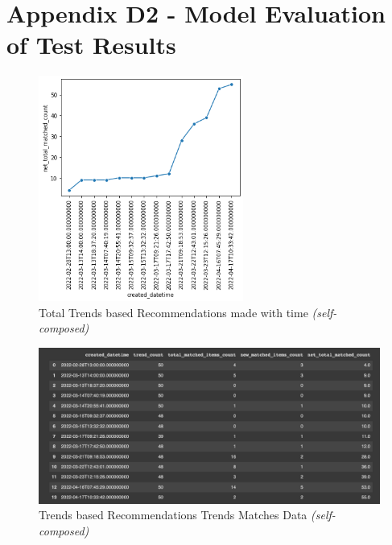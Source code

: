 \clearpage
\section*{Appendix D2 - Model Evaluation of Test Results}

\begin{figure}[h!]
\centering
\includegraphics[width=0.6\textwidth]{images/Testing/trends/trends-matches-eval2.png}
\caption{Total Trends based Recommendations made with time \textit{(self-composed)}}
\label{fig:trends-recsys-total-matches}
\end{figure}

\begin{figure}[h!]
\centering
\includegraphics[width=\textwidth]{images/Testing/trends/trend-match-count-data.png}
\caption{Trends based Recommendations Trends Matches Data \textit{(self-composed)}}
\label{fig:trends-recsys-trends-matches-data}
\end{figure}

